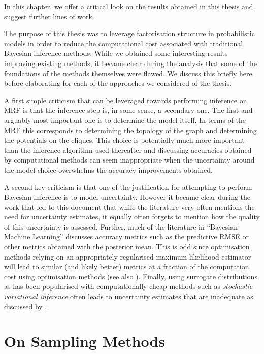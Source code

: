
In this chapter, we offer a critical look on the results obtained in this thesis and suggest further lines of work.

The purpose of this thesis was to leverage factorisation structure in probabilistic models in order to reduce the computational cost associated with traditional Bayesian inference methods. While we obtained some interesting results improving existing methods, it became clear during the analysis that some of the foundations of the methods themselves were flawed. We discuss this briefly here before elaborating for each of the approaches we considered of the thesis. 

A first simple criticism that can be leveraged towards performing inference on MRF is that the inference step is, in some sense, a secondary one. The first and arguably most important one is to determine the model itself. In terms of the MRF this corresponds to determining the topology of the graph and determining the potentials on the cliques. This choice is potentially much more important than the inference algorithm used thereafter and discussing accuracies obtained by computational methods can seem inappropriate when the uncertainty around the model choice overwhelms the accuracy improvements obtained. 

A second key criticism is that one of the justification for attempting to perform Bayesian inference is to model uncertainty. However it became clear during the work that led to this document that while the literature very often mentions the need for uncertainty estimates, it equally often forgets to mention how the quality of this uncertainty is assessed. Further, much of the literature in ``Bayesian Machine Learning'' discusses accuracy metrics such as the predictive RMSE or other metrics obtained with the posterior mean. This is odd since optimisation methods relying on an appropriately regularised maximum-likelihood estimator will lead to similar (and likely better) metrics at a fraction of the computation cost using optimisation methods (see also \citep{green15}). %
Finally, using surrogate distributions as has been popularised with computationally-cheap methods such as \emph{stochastic variational inference} \citep{hoffman13} often leads to uncertainty estimates that are inadequate as discussed by \cite{wang05}.

\section{On Sampling Methods}

